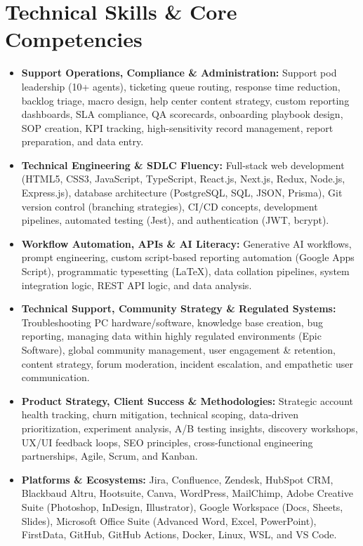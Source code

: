 \documentclass[10pt,letterpaper]{article}
\begin{document}
\section{Technical Skills \& Core Competencies}
\begin{itemize}
    \item \textbf{Support Operations, Compliance \& Administration:} Support pod leadership (10+ agents), ticketing queue routing, response time reduction, backlog triage, macro design, help center content strategy, custom reporting dashboards, SLA compliance, QA scorecards, onboarding playbook design, SOP creation, KPI tracking, high-sensitivity record management, report preparation, and data entry.
    \item \textbf{Technical Engineering \& SDLC Fluency:} Full-stack web development (HTML5, CSS3, JavaScript, TypeScript, React.js, Next.js, Redux, Node.js, Express.js), database architecture (PostgreSQL, SQL, JSON, Prisma), Git version control (branching strategies), CI/CD concepts, development pipelines, automated testing (Jest), and authentication (JWT, bcrypt).
    \item \textbf{Workflow Automation, APIs \& AI Literacy:} Generative AI workflows, prompt engineering, custom script-based reporting automation (Google Apps Script), programmatic typesetting (LaTeX), data collation pipelines, system integration logic, REST API logic, and data analysis.
    \item \textbf{Technical Support, Community Strategy \& Regulated Systems:} Troubleshooting PC hardware/software, knowledge base creation, bug reporting, managing data within highly regulated environments (Epic Software), global community management, user engagement \& retention, content strategy, forum moderation, incident escalation, and empathetic user communication.
    \item \textbf{Product Strategy, Client Success \& Methodologies:} Strategic account health tracking, churn mitigation, technical scoping, data-driven prioritization, experiment analysis, A/B testing insights, discovery workshops, UX/UI feedback loops, SEO principles, cross-functional engineering partnerships, Agile, Scrum, and Kanban.
\item \textbf{Platforms \& Ecosystems:} Jira, Confluence, Zendesk, HubSpot CRM, Blackbaud Altru, Hootsuite, Canva, WordPress, MailChimp, Adobe Creative Suite (Photoshop, InDesign, Illustrator), Google Workspace (Docs, Sheets, Slides), Microsoft Office Suite (Advanced Word, Excel, PowerPoint), FirstData, GitHub, GitHub Actions, Docker, Linux, WSL, and VS Code.
\end{itemize}
\end{document}
